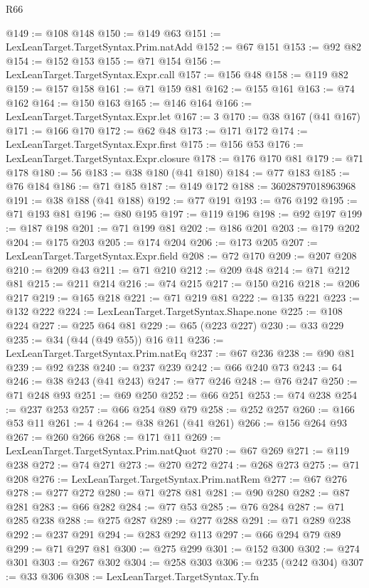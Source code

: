 \begin{lexlean}{R66}
\begin{coremodule}
@149 := @108 @148
@150 := @149 @63
@151 := LexLeanTarget.TargetSyntax.Prim.natAdd
@152 := @67 @151
@153 := @92 @82
@154 := @152 @153
@155 := @71 @154
@156 := LexLeanTarget.TargetSyntax.Expr.call
@157 := @156 @48
@158 := @119 @82
@159 := @157 @158
@161 := @71 @159 @81
@162 := @155 @161
@163 := @74 @162
@164 := @150 @163
@165 := @146 @164
@166 := LexLeanTarget.TargetSyntax.Expr.let
@167 := 3
@170 := @38 @167 (@41 @167)
@171 := @166 @170
@172 := @62 @48
@173 := @171 @172
@174 := LexLeanTarget.TargetSyntax.Expr.first
@175 := @156 @53
@176 := LexLeanTarget.TargetSyntax.Expr.closure
@178 := @176 @170 @81
@179 := @71 @178
@180 := 56
@183 := @38 @180 (@41 @180)
@184 := @77 @183
@185 := @76 @184
@186 := @71 @185
@187 := @149 @172
@188 := 36028797018963968
@191 := @38 @188 (@41 @188)
@192 := @77 @191
@193 := @76 @192
@195 := @71 @193 @81
@196 := @80 @195
@197 := @119 @196
@198 := @92 @197
@199 := @187 @198
@201 := @71 @199 @81
@202 := @186 @201
@203 := @179 @202
@204 := @175 @203
@205 := @174 @204
@206 := @173 @205
@207 := LexLeanTarget.TargetSyntax.Expr.field
@208 := @72 @170
@209 := @207 @208
@210 := @209 @43
@211 := @71 @210
@212 := @209 @48
@214 := @71 @212 @81
@215 := @211 @214
@216 := @74 @215
@217 := @150 @216
@218 := @206 @217
@219 := @165 @218
@221 := @71 @219 @81
@222 := @135 @221
@223 := @132 @222
@224 := LexLeanTarget.TargetSyntax.Shape.none
@225 := @108 @224
@227 := @225 @64 @81
@229 := @65 (@223 @227)
@230 := @33 @229
@235 := @34 (@44 (@49 @55)) @16 @11
@236 := LexLeanTarget.TargetSyntax.Prim.natEq
@237 := @67 @236
@238 := @90 @81
@239 := @92 @238
@240 := @237 @239
@242 := @66 @240 @73
@243 := 64
@246 := @38 @243 (@41 @243)
@247 := @77 @246
@248 := @76 @247
@250 := @71 @248 @93
@251 := @69 @250
@252 := @66 @251
@253 := @74 @238
@254 := @237 @253
@257 := @66 @254 @89 @79
@258 := @252 @257
@260 := @166 @53 @11
@261 := 4
@264 := @38 @261 (@41 @261)
@266 := @156 @264 @93
@267 := @260 @266
@268 := @171 @11
@269 := LexLeanTarget.TargetSyntax.Prim.natQuot
@270 := @67 @269
@271 := @119 @238
@272 := @74 @271
@273 := @270 @272
@274 := @268 @273
@275 := @71 @208
@276 := LexLeanTarget.TargetSyntax.Prim.natRem
@277 := @67 @276
@278 := @277 @272
@280 := @71 @278 @81
@281 := @90 @280
@282 := @87 @281
@283 := @66 @282
@284 := @77 @53
@285 := @76 @284
@287 := @71 @285 @238
@288 := @275 @287
@289 := @277 @288
@291 := @71 @289 @238
@292 := @237 @291
@294 := @283 @292 @113
@297 := @66 @294 @79 @89
@299 := @71 @297 @81
@300 := @275 @299
@301 := @152 @300
@302 := @274 @301
@303 := @267 @302
@304 := @258 @303
@306 := @235 (@242 @304)
@307 := @33 @306
@308 := LexLeanTarget.TargetSyntax.Ty.fn

\end{coremodule}
\end{lexlean}
